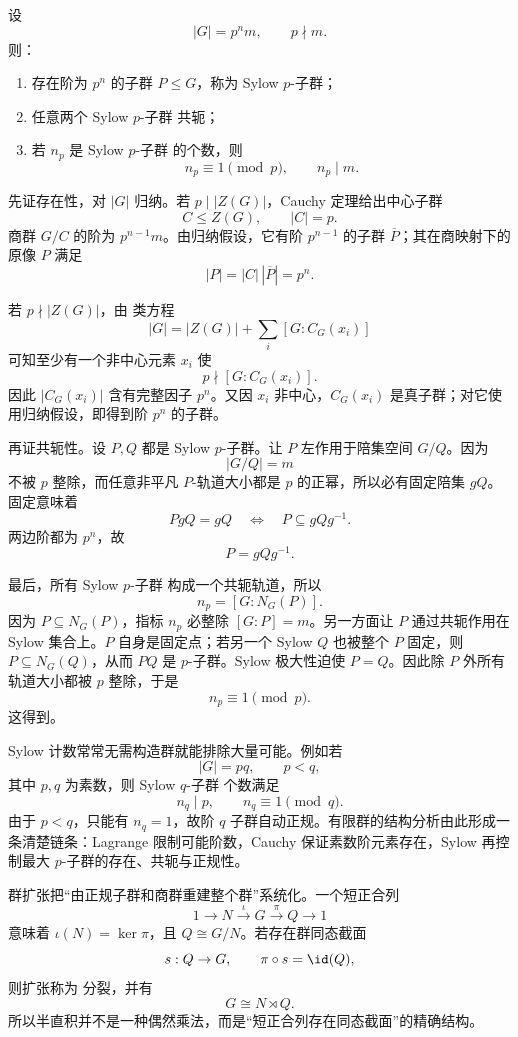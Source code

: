 \begin{theorem}[Sylow 定理]\label{thm:math-group-sylow}
设
\[
|G|=p^n m,
\qquad p\nmid m.
\]
则：
\begin{enumerate}[label=(\roman*)]
\item 存在阶为 $p^n$ 的子群 $P\le G$，称为 Sylow $p$-子群；
\item 任意两个 Sylow $p$-子群 共轭；
\item 若 $n_p$ 是 Sylow $p$-子群 的个数，则
\begin{equation}
{
n_p\equiv1\pmod p,
\qquad
n_p\mid m.
}
\label{eq:math-group-sylow-count}
\end{equation}
\end{enumerate}
\end{theorem}

先证存在性，对 $|G|$ 归纳。若 $p\mid|Z(G)|$，Cauchy 定理给出中心子群
\[
C\le Z(G),\qquad |C|=p.
\]
商群 $G/C$ 的阶为 $p^{n-1}m$。由归纳假设，它有阶 $p^{n-1}$ 的子群 $\overline P$；其在商映射下的原像 $P$ 满足
\[
|P|=|C|\,|\overline P|=p^n.
\]

若 $p\nmid|Z(G)|$，由 类方程
\[
|G|=|Z(G)|+\sum_i[G:C_G(x_i)]
\]
可知至少有一个非中心元素 $x_i$ 使
\[
p\nmid[G:C_G(x_i)].
\]
因此 $|C_G(x_i)|$ 含有完整因子 $p^n$。又因 $x_i$ 非中心，$C_G(x_i)$ 是真子群；对它使用归纳假设，即得到阶 $p^n$ 的子群。

再证共轭性。设 $P,Q$ 都是 Sylow $p$-子群。让 $P$ 左作用于陪集空间 $G/Q$。因为
\[
|G/Q|=m
\]
不被 $p$ 整除，而任意非平凡 $P$-轨道大小都是 $p$ 的正幂，所以必有固定陪集 $gQ$。固定意味着
\[
PgQ=gQ
\quad\Longleftrightarrow\quad
P\subseteq gQg^{-1}.
\]
两边阶都为 $p^n$，故
\[
P=gQg^{-1}.
\]

最后，所有 Sylow $p$-子群 构成一个共轭轨道，所以
\[
n_p=[G:N_G(P)].
\]
因为 $P\subseteq N_G(P)$，指标 $n_p$ 必整除 $[G:P]=m$。另一方面让 $P$ 通过共轭作用在 Sylow 集合上。$P$ 自身是固定点；若另一个 Sylow $Q$ 也被整个 $P$ 固定，则 $P\subseteq N_G(Q)$，从而 $PQ$ 是 $p$-子群。Sylow 极大性迫使 $P=Q$。因此除 $P$ 外所有轨道大小都被 $p$ 整除，于是
\[
n_p\equiv1\pmod p.
\]
这得到。

Sylow 计数常常无需构造群就能排除大量可能。例如若
\[
|G|=pq,
\qquad p<q,
\]
其中 $p,q$ 为素数，则 Sylow $q$-子群 个数满足
\[
n_q\mid p,
\qquad
n_q\equiv1\pmod q.
\]
由于 $p<q$，只能有 $n_q=1$，故阶 $q$ 子群自动正规。有限群的结构分析由此形成一条清楚链条：Lagrange 限制可能阶数，Cauchy 保证素数阶元素存在，Sylow 再控制最大 $p$-子群的存在、共轭与正规性。

群扩张把“由正规子群和商群重建整个群”系统化。一个短正合列
\begin{equation*}1\longrightarrow N
\xrightarrow{\iota}G
\xrightarrow{\pi}Q
\longrightarrow1\end{equation*}
意味着 $\iota(N)=\ker\pi$，且 $Q\cong G/N$。若存在群同态截面
\[
s:Q\to G,
\qquad
\pi\circ s=\id(Q),
\]
则扩张称为 分裂，并有
\[
G\cong N\rtimes Q.
\]
所以半直积并不是一种偶然乘法，而是“短正合列存在同态截面”的精确结构。

